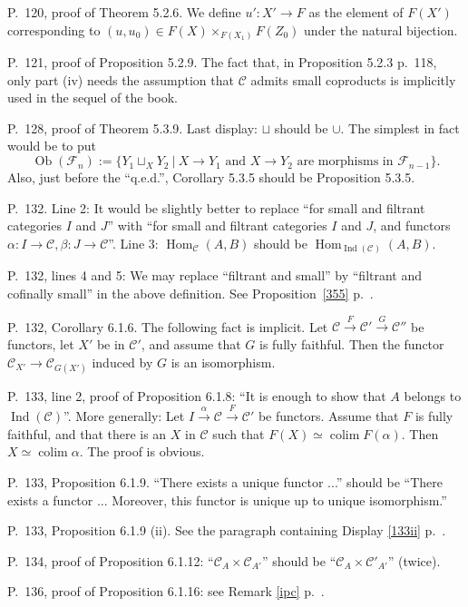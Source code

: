 \documentclass[12pt]{article}
\theoremstyle{remark}%
\newcommand{\n}{\noindent}
\newcommand{\C}{\mathcal C}
\newcommand{\F}{\mathcal F}
\newcommand{\pr}{Proposition}
\DeclareMathOperator*{\coli}{colim}
\DeclareMathOperator{\Hom}{Hom}
\DeclareMathOperator{\Ind}{Ind}
\DeclareMathOperator{\Ob}{Ob}
\begin{document}
\n P.~120, proof of Theorem 5.2.6. We define $u':X'\to F$ as the element of $F(X')$ corresponding to $(u,u_0)\in F(X)\times_{F(X_1)}F(Z_0)$ under the natural bijection. 

\n P.~121, proof of Proposition 5.2.9. The fact that, in Proposition 5.2.3 p.~118, only part (iv) needs the assumption that $\C$ admits small coproducts is implicitly used in the sequel of the book. 

\n P.~128, proof of Theorem 5.3.9. Last display: $\sqcup$ should be $\cup$. The simplest in fact would be to put 
$$
\Ob(\F_n):=\{Y_1\sqcup_XY_2\ |\ X\to Y_1\text{ and }X\to Y_2\text{ are morphisms in }\F_{n-1}\}.
$$ 
Also, just before the ``q.e.d.'', Corollary 5.3.5 should be Proposition 5.3.5. 

\n P.~132. Line 2: It would be slightly better to replace ``for small and filtrant categories $I$ and $J$'' with ``for small and filtrant categories $I$ and $J$, and functors $\alpha:I\to\C,\beta:J\to\C$''. Line 3: $\Hom_\C(A,B)$ should be $\Hom_{\Ind(\C)}(A,B)$. 

\n P.~132, lines 4 and 5: \guillemotleft We may replace ``filtrant and small'' by ``filtrant and cofinally small'' in the above definition\guillemotright. See \pr\ \ref{355} p.~\pageref{355}. 

\n P.~132, Corollary 6.1.6. The following fact is implicit. Let $\C\xrightarrow{F}\C'\xrightarrow{G}\C''$ be functors, let $X'$ be in $\C'$, and assume that $G$ is fully faithful. Then the functor $\C_{X'}\to\C_{G(X')}$ induced by $G$ is an isomorphism. 

\n P.~133, line 2, proof of Proposition 6.1.8: ``It is enough to show that $A$ belongs to $\Ind(\C)$''. More generally: Let $I\xrightarrow{\alpha}\C\xrightarrow{F}\C'$ be functors. Assume that $F$ is fully faithful, and that there is an $X$ in $\C$ such that $F(X)\simeq\coli F(\alpha)$. Then $X\simeq\coli\alpha$. The proof is obvious. 

\n P.~133, Proposition 6.1.9. ``There exists a unique functor ...'' should be ``There exists a functor ... Moreover, this functor is unique up to unique isomorphism.'' 

\n P.~133, Proposition 6.1.9 (ii). See the paragraph containing Display \eqref{133ii} p.~\pageref{133ii}. 

\n P.~134, proof of Proposition 6.1.12: ``$\C_A\times\C_{A'}$'' should be ``$\C_A\times\C'_{A'}$'' (twice). 

\n P.~136, proof of Proposition 6.1.16: see Remark \ref{ipc} p.~\pageref{ipc}. 
\end{document}
